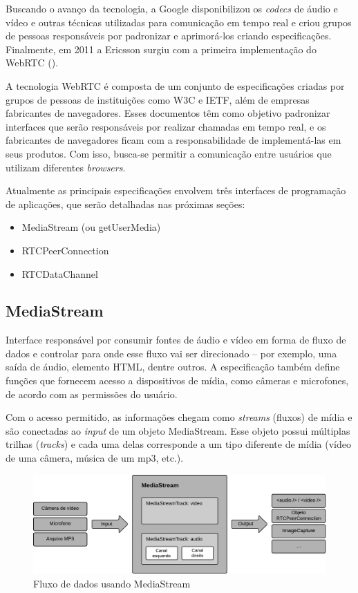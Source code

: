 Buscando o avanço da tecnologia, a Google disponibilizou os \textit{codecs} de áudio e vídeo e outras técnicas utilizadas para comunicação em tempo real e criou grupos de pessoas responsáveis por padronizar e aprimorá-los criando especificações. Finalmente, em 2011 a Ericsson surgiu com a primeira implementação do WebRTC (\cite{ericssonwebrtc}).

A tecnologia WebRTC é composta de um conjunto de especificações criadas por grupos de pessoas de instituições como W3C e IETF, além de empresas fabricantes de navegadores. Esses documentos têm como objetivo padronizar interfaces que serão responsáveis por realizar chamadas em tempo real, e os fabricantes de navegadores ficam com a responsabilidade de implementá-las em seus produtos. Com isso, busca-se permitir a comunicação entre usuários que utilizam diferentes \textit{browsers}. 

Atualmente as principais especificações envolvem três interfaces de programação de aplicações, que serão detalhadas nas próximas seções:

\begin{itemize}
	\item MediaStream (ou getUserMedia) \cite[Sec.~4.2]{getusermedia2017}
    \item RTCPeerConnection \cite[Sec.~4.4]{w3cwebrtc2017}
    \item RTCDataChannel \cite[Sec.~4.6]{w3cwebrtc2017}
\end{itemize}

\subsection{MediaStream}

Interface responsável por consumir fontes de áudio e vídeo em forma de fluxo de dados e controlar para onde esse fluxo vai ser direcionado -- por exemplo, uma saída de áudio, elemento HTML, dentre outros.  A especificação também define funções que fornecem acesso a dispositivos de mídia, como câmeras e microfones, de acordo com as permissões do usuário. 

Com o acesso permitido, as informações chegam como \textit{streams} (fluxos) de mídia e são conectadas ao \textit{input} de um objeto MediaStream. Esse objeto possui múltiplas trilhas (\textit{tracks}) e cada uma delas corresponde a um tipo diferente de mídia (vídeo de uma câmera, música de um mp3, etc.). 

\begin{figure}[ht!]
	\centering
		\includegraphics[scale=0.35]{figures/overview-mediastream.png} 
	\caption{Fluxo de dados usando MediaStream}
	\label{fig:overview_mediastream}
\end{figure}

